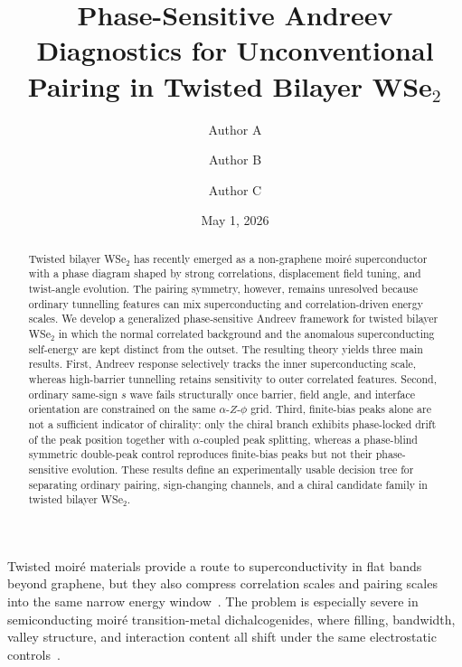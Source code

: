 \documentclass[aps,prl,twocolumn,superscriptaddress,longbibliography]{revtex4-2}
\begin{document}
\title{Phase-Sensitive Andreev Diagnostics for Unconventional Pairing in Twisted Bilayer WSe$_2$}

\author{Author A}
\author{Author B}
\author{Author C}

\date{May 1, 2026}

\begin{abstract}
Twisted bilayer WSe$_2$ has recently emerged as a non-graphene moir\'e
superconductor with a phase diagram shaped by strong correlations, displacement
field tuning, and twist-angle evolution. The pairing symmetry, however, remains
unresolved because ordinary tunnelling features can mix superconducting and
correlation-driven energy scales. We develop a generalized
phase-sensitive Andreev framework for twisted bilayer WSe$_2$ in which the
normal correlated background and the anomalous superconducting self-energy are
kept distinct from the outset. The resulting theory yields three main results.
First, Andreev response selectively tracks the inner superconducting scale,
whereas high-barrier tunnelling retains sensitivity to outer correlated
features. Second, ordinary same-sign $s$ wave fails structurally once barrier,
field angle, and interface orientation are constrained on the same
$\alpha$-$Z$-$\phi$ grid. Third, finite-bias peaks alone are not a sufficient
indicator of chirality: only the chiral branch exhibits phase-locked drift of
the peak position together with $\alpha$-coupled peak splitting, whereas a
phase-blind symmetric double-peak control reproduces finite-bias peaks but not
their phase-sensitive evolution. These results define an experimentally usable
decision tree for separating ordinary pairing, sign-changing channels, and a
chiral candidate family in twisted bilayer WSe$_2$.
\end{abstract}

\maketitle

Twisted moir\'e materials provide a route to superconductivity in flat bands
beyond graphene, but they also compress correlation scales and pairing scales
into the same narrow energy window~\cite{Cao2018SC,Cao2018CI,Yankowitz2019,Lu2019,Park2021,Balents2020}.
The problem is especially severe in semiconducting moir\'e transition-metal
dichalcogenides, where filling, bandwidth, valley structure, and interaction
content all shift under the same electrostatic controls~\cite{Tang2020,Regan2020,Xu2022BilayerHubbard}.
\end{document}
